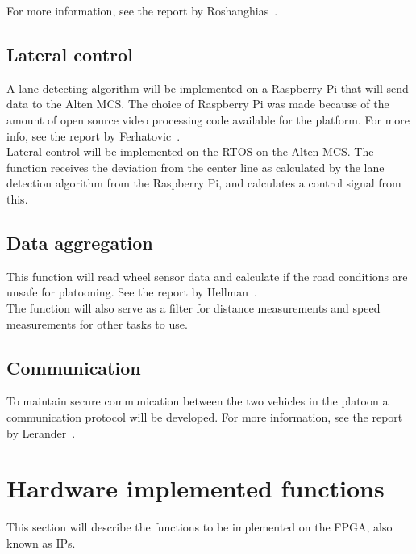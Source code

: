 For more information, see the report by Roshanghias~\cite{roshanghias2017}.

\subsection{Lateral control}
A lane-detecting algorithm will be implemented on a Raspberry Pi that will send data to the Alten MCS. The choice of Raspberry Pi was made because of the amount of open source video processing code available for the platform. For more info, see the report by Ferhatovic~\cite{ferhatovic2017}.\\

Lateral control will be implemented on the RTOS on the Alten MCS. The function receives the deviation from the center line as calculated by the lane detection algorithm from the Raspberry Pi, and calculates a control signal from this.

\subsection{Data aggregation}
This function will read wheel sensor data and calculate if the road conditions are unsafe for platooning. See the report by Hellman~\cite{hellman2017}.\\

The function will also serve as a filter for distance measurements and speed measurements for other tasks to use.

\subsection{Communication}
To maintain secure communication between the two vehicles in the platoon a communication protocol will be developed. For more information, see the report by Lerander~\cite{lerander2017}.%


\section{Hardware implemented functions}
This section will describe the functions to be implemented on the FPGA, also known as IPs.

